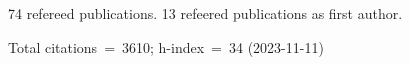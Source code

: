 74 refereed publications. 13 refeered publications as first author.

Total citations~=~3610; h-index~=~34 (2023-11-11)